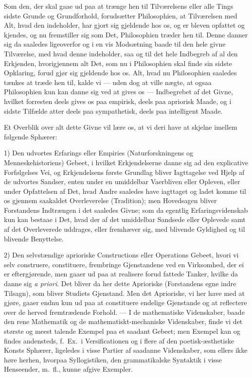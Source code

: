\documentclass[12pt,a4paper]{book}
\newcommand{\apage}[1]{\marginnote{\footnotesize\textit{[#1]}}}
\begin{document}
Som den, der skal gaae ud paa at trænge hen til Tilværelsens eller alle Tings
sidste Grunde og Grundforhold, forudsætter Philosophien, at Tilværelsen med Alt,
hvad den indeholder, har gjort sig gjeldende hos os, og er bleven opfattet og
kjendes, og nu fremstiller sig som Det, Philosophien træder hen til. Denne danner
sig da saaledes ligeoverfor og i en vis Modsætning baade til den hele givne
Tilværelse, med hvad denne indeholder, saa og til det hele Indbegreb af al den
Erkjenden, hvorigjennem alt Det, som nu i Philosophien skal finde sin sidste
Opklaring, forud gjør sig gjeldende hos os. Alt, hvad nu Philosophien \apage{34}  saaledes
tænkes at træde hen til, kalde vi --- uden dog at ville nægte, at ogsaa
Philosophien kun kan danne sig ved at gives os --- Indbegrebet af det Givne,
hvilket forresten deels gives os paa empirisk, deels paa apriorisk Maade, og i
sidste Tilfælde atter deels paa sympathetisk, deels paa intelligent Maade.

Et Overblik over alt dette Givne vil lære os, at vi deri have at skjelne imellem
følgende Sphærer:

1) Den udvortes Erfarings eller Empiries (Naturforskningens og Menneskehistoriens)
Gebeet, i hvilket Erkjendelserne danne sig ad den explicative Forfølgelses Vei, og
Erkjendelsens første Grundlag bliver Iagttagelse ved Hjelp af de udvortes Sandser,
enten under en umiddelbar Vaerbliven eller Opleven, eller under Opfattelsen af Det,
hvad Andre saaledes have iagttaget og ladet komme til os gjennem saakaldet
Overleverelse (Tradition); men Hovedsagen bliver Forstandens Indtrængen i det
saaledes Givne; som da egentlig Erfaringsvidenskab kun kan bestaae i Det, hvad der
af det umiddelbar Sandsede eller Oplevede samt af det Overleverede uddrages, eller
fremhæver sig, med blivende Gyldighed og til blivende Benyttelse.

2) Den selvstændige aprioriske Constructions eller Operations Gebeet, hvori vi selv
construere, constituere, frembringe Gjenstandene ved en Virksomhed, der ei er
eftergjørende, men gaaer ud paa at realisere forud fattede Tanker, hvilke da danne
sig \textit{a priori}. Det bliver da her dette Aprioriske (Forstandens egne indre
Tilsagn), som bliver Studiets Gjenstand. Men det Aprioriske, vi her have med at
gjøre, gaaer endnu kun ud paa at constituere endelige Gjenstande og at reflectere
over de herved fremtrædende Forhold. --- I de mathematiske Videnskaber, baade den
rene Mathematik og de mathematiskt-mechaniske Videnskaber, finde vi det største og
meest talende Exempel paa et saadant Gebeet; men Exempel kan og findes andensteds,
f.\ Ex.\ i Versificationen og i flere af den poetisk-æsthetiske Konsts Sphærer,
ligeledes i visse Partier af saadanne Videnskaber, som ellers ikke høre  \apage{35} herhen,
hvorpaa Syllogistiken, den grammatikalske Syntaktik i visse Henseender, m.\ fl.,
kunne afgive Exempler.
\end{document}
